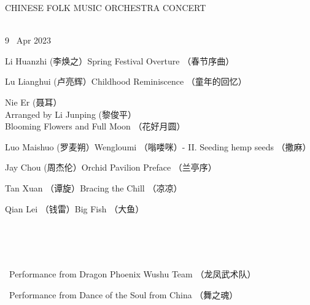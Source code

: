 \documentclass[letter,8pt,poets]{ConcProg}
\begin{document}

 \begin{spacing}{1.0} 
\begin{center}
\Huge{C}\large{HINESE } \Huge{F}\large{OLK} \Huge{M}\large{USIC} \Huge{O}\large{RCHESTRA} \Huge{C}\LARGE{ONCERT}
\end{center}
\begin{programme}{
\\  {\normalsize 9 ~Apr 2023}
}
  \begin{part}[]
    
    
   \begin{composition}{Li Huanzhi (李焕之）}{}{Spring Festival Overture （春节序曲）}{}      
    \end{composition} 
    
    
     \begin{composition}{Lu Lianghui (卢亮辉）}{}{Childhood Reminiscence （童年的回忆）}{}      
    \end{composition} 
    
     \begin{composition}{Nie Er (聂耳）\\ Arranged by Li Junping (黎俊平）}{}{Blooming Flowers and Full Moon （花好月圆）}{}      
    \end{composition} 
    
    \begin{composition}{Luo Maishuo (罗麦朔）}{}{Wengloumi （嗡喽咪）- II. Seeding hemp seeds （撒麻）}{}      
    \end{composition} 
    
    \begin{composition}{Jay Chou (周杰伦）}{}{Orchid Pavilion Preface （兰亭序）}{}      
    \end{composition} 
    
     \begin{composition}{Tan Xuan （谭旋）}{}{Bracing the Chill （凉凉）}{}      
    \end{composition} 
    \begin{composition}{Qian Lei （钱雷）}{}{Big Fish （大鱼）}{}      
    \end{composition} \\
    \\
    \\
    \begin{composition}{\ }{}{Performance from Dragon Phoenix Wushu Team （龙凤武术队）}{}      
    \end{composition} 
     \begin{composition}{\ }{}{Performance from Dance of the Soul from China （舞之魂）}{}      
    \end{composition} 
    

\end{part}
\end{programme}
\end{spacing}
\end{document}

